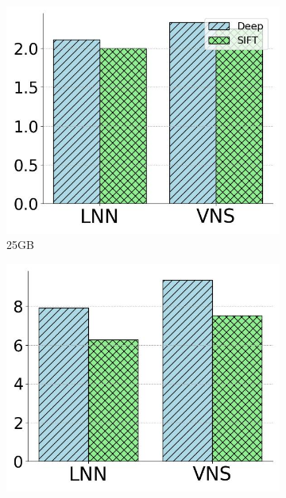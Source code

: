 \begin{figure}[htbp]
\begin{subfigure}{0.028\textwidth}
        \vspace{0.5cm}
    \end{subfigure}
     \centering
        \begin{subfigure}{0.28\textwidth}
        \captionsetup{justification=centering}
	\centering	
        \includegraphics[width=\textwidth]{../img/oigas/CandNeighbors/25GB_Idx.jpg}
        \caption{25GB}
           \label{fig:VNvsLNN:25GB}
    \end{subfigure}    
         \begin{subfigure}{0.28\textwidth}
         \captionsetup{justification=centering}
	\centering	
        \includegraphics[width=\textwidth]{../img/oigas/CandNeighbors/100GB_Idx.jpg}

\end{subfigure}
\end{figure}
